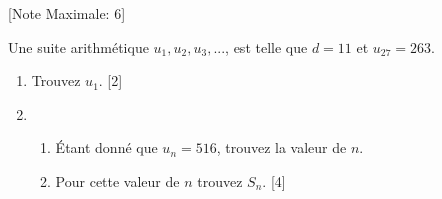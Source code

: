\begin{question}
  \hspace*{\fill} [Note Maximale: 6]\par
  \noindent Une suite arithmétique $u_1, u_2, u_3, ...$, est telle que $d = 11$ et $u_{27} = 263$.\par
  \begin{enumerate}[label=(\alph*)]
    \item Trouvez $u_1$.\hspace*{\fill} [2]
    \item 
      \begin{enumerate}[label=(\roman*)]
        \item Étant donné que $u_n = 516$, trouvez la valeur de $n$.
        \item Pour cette valeur de $n$ trouvez $S_n$.\hspace*{\fill} [4]
      \end{enumerate}
  \end{enumerate}
\end{question}
